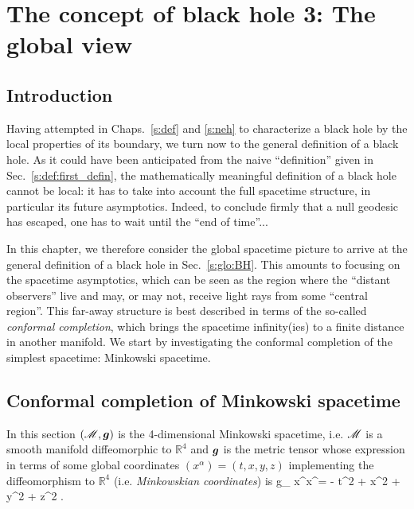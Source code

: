 \chapter{The concept of black hole 3: The global view}
\label{s:glo}

\minitoc

\section{Introduction}

Having attempted in Chaps.~\ref{s:def} and \ref{s:neh} to characterize a black hole by the local
properties of its boundary, we turn now to the general definition of a black
hole. As it could have been anticipated from the naive ``definition'' given
in Sec.~\ref{s:def:first_defin}, the mathematically meaningful definition
of a black hole cannot be local: it has to take into account the full
spacetime structure, in particular its future asymptotics. Indeed, to conclude
firmly that a null geodesic has escaped, one has to wait until the ``end
of time''...

In this chapter, we therefore consider the global spacetime picture to
arrive at the general definition of a black hole in
Sec.~\ref{s:glo:BH}.
This amounts to focusing on the
spacetime asymptotics, which can be seen as
the region where the ``distant observers'' live and may, or may not, receive
light rays from some ``central region''. This far-away structure is best
described in terms of the so-called \emph{conformal completion}, which brings
the spacetime infinity(ies) to a finite distance in another manifold.
We start by investigating the conformal completion of the simplest
spacetime: Minkowski spacetime.


\section{Conformal completion of Minkowski spacetime} \label{s:glo:conf_Mink}

In this section $(\mathscr{M},\bm{g})$ is the 4-dimensional Minkowski spacetime,
i.e. $\mathscr{M}$ is a smooth manifold diffeomorphic to $\mathbb{R}^4$ and $\bm{g}$
is the metric tensor whose expression in terms of some global coordinates
$(x^\alpha) = (t, x, y, z)$ implementing the diffeomorphism to $\mathbb{R}^4$
(i.e. \emph{Minkowskian coordinates})
is
\be \label{e:glo:Mink_metric}
    g_{\mu\nu} \D x^\mu \D x^\nu = - \D t^2 + \D x^2 + \D y^2 + \D z^2 .
\ee


